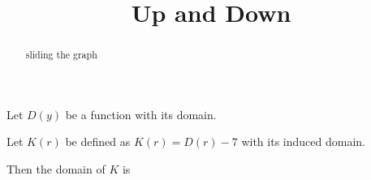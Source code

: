 \documentclass{ximera}
\title{Up and Down}
\begin{document}
\begin{abstract}
sliding the graph
\end{abstract}
\maketitle











Let $D(y)$ be a function with its domain.

Let $K(r)$ be defined as $K(r) = D(r)-7$ with its induced domain.


Then the domain of $K$ is

\begin{multipleChoice}
\end{multipleChoice}
\end{document}
